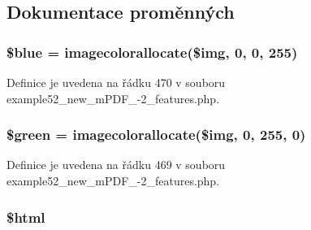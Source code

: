 \subsection{Dokumentace proměnných}
\hypertarget{example52__new__m_p_d_f__4-2__features_8php_aac967a3cffede2c1bca951963ec2f65b}{
\subsubsection[{\$blue}]{\setlength{\rightskip}{0pt plus 5cm}\$blue = imagecolorallocate(\$img, 0, 0, 255)}}\label{example52__new__m_p_d_f__4-2__features_8php_aac967a3cffede2c1bca951963ec2f65b}


Definice je uvedena na řádku 470 v souboru example52\-\_\-new\-\_\-m\-P\-D\-F\-\_-\/2\-\_\-features.\-php.

\hypertarget{example52__new__m_p_d_f__4-2__features_8php_a3c6d70a77df9a2585942713794a6c3af}{
\subsubsection[{\$green}]{\setlength{\rightskip}{0pt plus 5cm}\$green = imagecolorallocate(\$img, 0, 255, 0)}}\label{example52__new__m_p_d_f__4-2__features_8php_a3c6d70a77df9a2585942713794a6c3af}


Definice je uvedena na řádku 469 v souboru example52\-\_\-new\-\_\-m\-P\-D\-F\-\_-\/2\-\_\-features.\-php.

\hypertarget{example52__new__m_p_d_f__4-2__features_8php_a6f96e7fc92441776c9d1cd3386663b40}{
\subsubsection[{\$html}]{\setlength{\rightskip}{0pt plus 5cm}\$html}}\label{example52__new__m_p_d_f__4-2__features_8php_a6f96e7fc92441776c9d1cd3386663b40}



